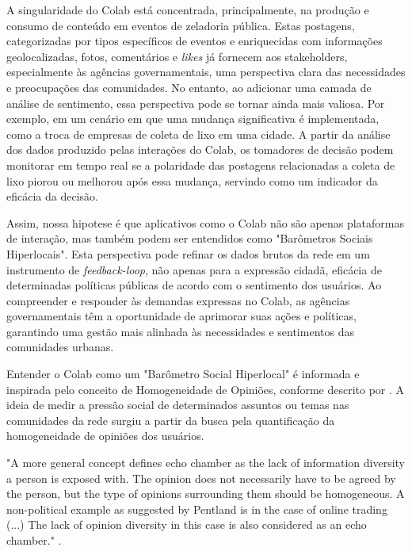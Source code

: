 A singularidade do Colab está concentrada, principalmente, na produção e consumo de conteúdo em eventos de zeladoria pública. Estas postagens, categorizadas por tipos específicos de eventos e enriquecidas com informações geolocalizadas, fotos, comentários e \textit{likes} já fornecem aos stakeholders, especialmente às agências governamentais, uma perspectiva clara das necessidades e preocupações das comunidades. No entanto, ao adicionar uma camada de análise de sentimento, essa perspectiva pode se tornar ainda mais valiosa. Por exemplo, em um cenário em que uma mudança significativa é implementada, como a troca de empresas de coleta de lixo em uma cidade. A partir da análise dos dados produzido pelas interações do Colab, os tomadores de decisão podem monitorar em tempo real se a polaridade das postagens relacionadas a coleta de lixo piorou ou melhorou após essa mudança, servindo como um indicador da eficácia da decisão.

Assim, nossa hipotese é que aplicativos como o Colab não são apenas plataformas de interação, mas também podem ser entendidos como "Barômetros Sociais Hiperlocais". Esta perspectiva pode refinar os dados brutos da rede em um instrumento de \textit{feedback-loop}, não apenas para a expressão cidadã, eficácia de determinadas políticas públicas de acordo com o sentimento dos usuários. Ao compreender e responder às demandas expressas no Colab, as agências governamentais têm a oportunidade de aprimorar suas ações e políticas, garantindo uma gestão mais alinhada às necessidades e sentimentos das comunidades urbanas.

Entender o Colab como um "Barômetro Social Hiperlocal" é informada e inspirada pelo conceito de Homogeneidade de Opiniões, conforme descrito por . A ideia de medir a pressão social de determinados assuntos ou temas nas comunidades da rede surgiu a partir da busca pela quantificação da homogeneidade de opiniões dos usuários.

\begin{citacao}
	"A more general concept defines echo chamber as the lack of information diversity a person is exposed with. The opinion does not necessarily have to be agreed by the person, but the type of opinions surrounding them should be homogeneous. A non-political example as suggested by Pentland is in the case of online trading (...) The lack of opinion diversity in this case is also considered as an echo chamber." \cite[p. 17]{2023_Atiqi_BOOK}.
\end{citacao}

